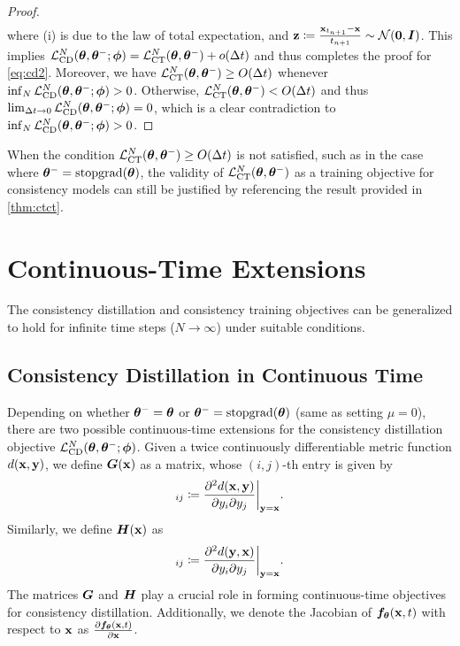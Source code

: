 \begin{appendices}
\begin{proof}
\begin{align}
\end{align}
where (i) is due to the law of total expectation, and ${\mathbf{z}} \coloneqq \frac{{\mathbf{x}}_{t_{n+1}} - {\mathbf{x}}}{t_{n+1}} \sim \mathcal{N}(\bm{0}, {\bm{I}})$. This implies $\mathcal{L}_\text{CD}^N({\bm{\theta}}, {\bm{\theta}}^{-}; {\bm{\phi}}) = \mathcal{L}_\text{CT}^N({\bm{\theta}}, {\bm{\theta}}^{-}) + o(\Delta t)$ and thus completes the proof for \cref{eq:cd2}. Moreover, we have $\mathcal{L}_\text{CT}^N({\bm{\theta}}, {\bm{\theta}}^{-}) \geq O(\Delta t)$ whenever $\inf_N \mathcal{L}_\text{CD}^N({\bm{\theta}}, {\bm{\theta}}^{-}; {\bm{\phi}}) > 0$. Otherwise, $\mathcal{L}_\text{CT}^N({\bm{\theta}}, {\bm{\theta}}^{-}) < O(\Delta t)$ and thus $\lim_{\Delta t \to 0} \mathcal{L}_\text{CD}^N({\bm{\theta}}, {\bm{\theta}}^{-}; {\bm{\phi}}) = 0$, which is a clear contradiction to $\inf_N \mathcal{L}_\text{CD}^N({\bm{\theta}}, {\bm{\theta}}^{-}; {\bm{\phi}}) > 0$.
\end{proof}
\begin{remark}
    When the condition $\mathcal{L}_\text{CT}^N({\bm{\theta}}, {\bm{\theta}}^{-}) \geq O(\Delta t)$ is not satisfied, such as in the case where ${\bm{\theta}}^{-} = \operatorname{stopgrad}({\bm{\theta}})$, the validity of $\mathcal{L}_\text{CT}^N({\bm{\theta}}, {\bm{\theta}}^{-})$ as a training objective for consistency models can still be justified by referencing the result provided in \cref{thm:ctct}.
\end{remark}

\section{Continuous-Time Extensions}\label{app:continuous}
The consistency distillation and consistency training objectives can be generalized to hold for infinite time steps ($N\to\infty$) under suitable conditions.

\subsection{Consistency Distillation in Continuous Time} \label{sec:ctcd}
Depending on whether ${\bm{\theta}}^- = {\bm{\theta}}$ or ${\bm{\theta}}^- = \operatorname{stopgrad}({\bm{\theta}})$ (same as setting $\mu=0$), there are two possible continuous-time extensions for the consistency distillation objective $\mathcal{L}_\text{CD}^N({\bm{\theta}}, {\bm{\theta}}^{-}; {\bm{\phi}})$. Given a twice continuously differentiable metric function $d({\mathbf{x}}, {\mathbf{y}})$, we define ${\bm{G}}({\mathbf{x}})$ as a matrix, whose $(i,j)$-th entry is given by
\begin{align*}
    [\mG(\rvx)]_{ij} \coloneqq \frac{\partial^2 d(\rvx, \rvy)}{\partial y_i \partial y_j} \bigg|_{\rvy=\rvx}.
\end{align*}
Similarly, we define ${\bm{H}}({\mathbf{x}})$ as
\begin{align*}
    [\mH(\rvx)]_{ij} \coloneqq \frac{\partial^2 d(\rvy, \rvx)}{\partial y_i \partial y_j} \bigg|_{\rvy=\rvx}.
\end{align*}
The matrices ${\bm{G}}$ and ${\bm{H}}$ play a crucial role in forming continuous-time objectives for consistency distillation. Additionally, we denote the Jacobian of ${\bm{f}}_{\bm{\theta}}({\mathbf{x}}, t)$ with respect to ${\mathbf{x}}$ as $\frac{\partial {\bm{f}}_{\bm{\theta}}({\mathbf{x}}, t)}{\partial {\mathbf{x}}}$.


\end{appendices}
